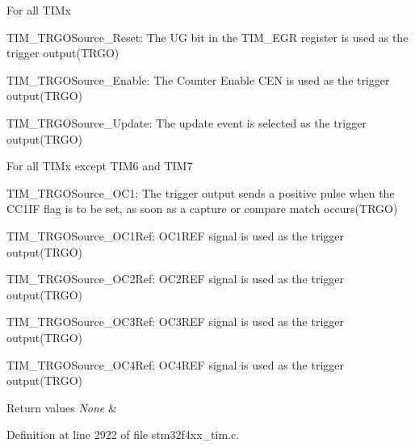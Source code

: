 \begin{DoxyItemize}
\item For all T\+I\+Mx \begin{DoxyItemize}
\item T\+I\+M\+\_\+\+T\+R\+G\+O\+Source\+\_\+\+Reset\+: The UG bit in the T\+I\+M\+\_\+\+E\+GR register is used as the trigger output(\+T\+R\+G\+O) \item T\+I\+M\+\_\+\+T\+R\+G\+O\+Source\+\_\+\+Enable\+: The Counter Enable C\+EN is used as the trigger output(\+T\+R\+G\+O) \item T\+I\+M\+\_\+\+T\+R\+G\+O\+Source\+\_\+\+Update\+: The update event is selected as the trigger output(\+T\+R\+G\+O)\end{DoxyItemize}

\item For all T\+I\+Mx except T\+I\+M6 and T\+I\+M7 \begin{DoxyItemize}
\item T\+I\+M\+\_\+\+T\+R\+G\+O\+Source\+\_\+\+O\+C1\+: The trigger output sends a positive pulse when the C\+C1\+IF flag is to be set, as soon as a capture or compare match occurs(\+T\+R\+G\+O) \item T\+I\+M\+\_\+\+T\+R\+G\+O\+Source\+\_\+\+O\+C1\+Ref\+: O\+C1\+R\+EF signal is used as the trigger output(\+T\+R\+G\+O) \item T\+I\+M\+\_\+\+T\+R\+G\+O\+Source\+\_\+\+O\+C2\+Ref\+: O\+C2\+R\+EF signal is used as the trigger output(\+T\+R\+G\+O) \item T\+I\+M\+\_\+\+T\+R\+G\+O\+Source\+\_\+\+O\+C3\+Ref\+: O\+C3\+R\+EF signal is used as the trigger output(\+T\+R\+G\+O) \item T\+I\+M\+\_\+\+T\+R\+G\+O\+Source\+\_\+\+O\+C4\+Ref\+: O\+C4\+R\+EF signal is used as the trigger output(\+T\+R\+G\+O)\end{DoxyItemize}

\begin{DoxyRetVals}{Return values}
{\em None} & \\
\hline
\end{DoxyRetVals}

\end{DoxyItemize}

Definition at line 2922 of file stm32f4xx\+\_\+tim.\+c.

\mbox{\label{group___t_i_m_ga2f19ce1d90990691cf037e419ba08003}} 
